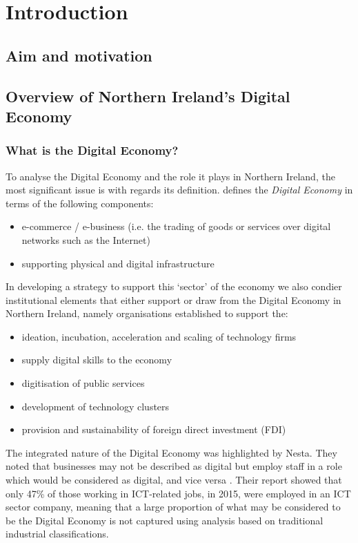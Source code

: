\setcounter{page}{1} 

\chapter{Introduction} 

\section{Aim and motivation} \label{sec:aimMotivation}


\section{Overview of Northern Ireland's Digital Economy}

\subsection{What is the Digital Economy?}

To analyse the Digital Economy and the role it plays in Northern Ireland, the most significant issue is with regards its definition. \citet{Mesenbourg2001} defines the \emph{Digital Economy} in terms of the following components:
\begin{itemize}
    \item e-commerce / e-business (i.e. the trading of goods or services over digital networks such as the Internet)
    \item supporting physical and digital infrastructure
\end{itemize}

In developing a strategy to support this `sector' of the economy we also condier institutional elements that either support or draw from the Digital Economy in Northern Ireland, namely organisations established to support the: 
\begin{itemize}
    \item ideation, incubation, acceleration and scaling of technology firms
    \item supply digital skills to the economy
    \item digitisation of public services
    \item development of technology clusters
    \item provision and sustainability of foreign direct investment (FDI)
\end{itemize}

The integrated nature of the Digital Economy was highlighted by Nesta. They noted that businesses may not be described as digital but employ staff in a role which would be considered as digital, and vice versa \citep{Spilsbury2016}. Their report showed that only 47\% of those working in ICT-related jobs, in 2015, were employed in an ICT sector company, meaning that a large proportion of what may be considered to be the Digital Economy is not captured using analysis based on traditional industrial classifications.


